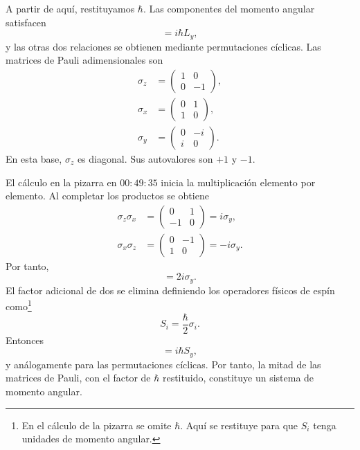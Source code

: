 A partir de aquí, restituyamos \(\hbar\). Las componentes del momento angular satisfacen
\begin{equation}
[L_{z},L_{x}]=i\hbar L_{y},
\end{equation}
y las otras dos relaciones se obtienen mediante permutaciones cíclicas. Las matrices de Pauli adimensionales son
\begin{equation}
\begin{aligned}
\sigma_{z}&=
\begin{pmatrix}
1&0\\
0&-1
\end{pmatrix},\\[0.4em]
\sigma_{x}&=
\begin{pmatrix}
0&1\\
1&0
\end{pmatrix},\\[0.4em]
\sigma_{y}&=
\begin{pmatrix}
0&-i\\
i&0
\end{pmatrix}.
\end{aligned}
\end{equation}
En esta base, \(\sigma_{z}\) es diagonal. Sus autovalores son \(+1\) y
\(-1\).

\begin{classroomqa}
\end{classroomqa}

El cálculo en la pizarra en \(00{:}49{:}35\) inicia la multiplicación elemento por elemento. Al completar los productos se obtiene
\begin{align}
\sigma_{z}\sigma_{x}
&=
\begin{pmatrix}
0&1\\
-1&0
\end{pmatrix}
=i\sigma_{y},\\
\sigma_{x}\sigma_{z}
&=
\begin{pmatrix}
0&-1\\
1&0
\end{pmatrix}
=-i\sigma_{y}.
\end{align}
Por tanto,
\begin{equation}
[\sigma_{z},\sigma_{x}]=2i\sigma_{y}.
\end{equation}
El factor adicional de dos se elimina definiendo los operadores físicos de espín como\footnote{En el cálculo de la pizarra se omite \(\hbar\). Aquí se restituye para que \(S_i\) tenga unidades de momento angular.}
\begin{equation}
S_{i}=\frac{\hbar}{2}\sigma_{i}.
\end{equation}
Entonces
\begin{equation}
[S_{z},S_{x}]=i\hbar S_{y},
\end{equation}
y análogamente para las permutaciones cíclicas. Por tanto, la mitad de las matrices de Pauli, con el factor de \(\hbar\) restituido, constituye un sistema de momento angular.

